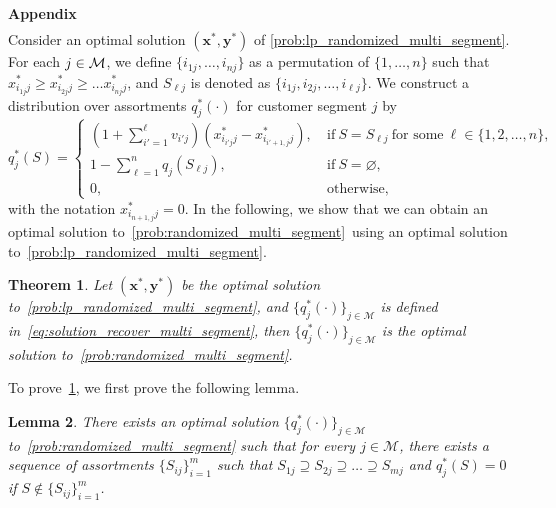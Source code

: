 \documentclass[msom,non-blindrev]{informs3} %
\newtheorem{theorem}{Theorem}
\newtheorem{lemma}[theorem]{Lemma}
\theoremstyle{definition}
\begin{document}
\begin{appendices}{\Large \noindent\textbf{Appendix}}
\begin{equation}
\begin{aligned}
\end{aligned}
\end{equation}
Consider an optimal solution $(\mathbf{x}^*,\mathbf{y}^*)$ of \eqref{prob:lp_randomized_multi_segment}. For each $j \in {\cal M}$, we define $\{i_{1j},\dots,i_{nj}\}$ as a permutation of $\{1,\dots,n\}$ such that $x^*_{i_{1j}j}\geq x^*_{i_{2j}j}\geq\dots x^*_{i_{nj}j}$, and $S_{\ell j}$ is denoted as $\{i_{1j},i_{2j},\dots,i_{\ell j}\}$. We construct a distribution over assortments $q_j^*(\cdot)$ for customer segment $j$ by
\begin{equation}
q^*_j(S)=\begin{cases}
\left(1+\sum_{i'=1}^\ell v_{i'j}\right)(x^*_{i_{i'j}j}-x^*_{i_{i'+1,j}j}),\ &\text{if}\ S=S_{\ell j}\ \text{for some}\ \ell\in\{1,2,\dots,n\},\\
1-\sum_{\ell=1}^n q_j(S_{\ell j}),\ &\text{if}\ S=\varnothing,\\
0,\ &\text{otherwise},
\end{cases}\label{eq:solution_recover_multi_segment}
\end{equation}
with the notation $x^*_{i_{n+1,j}j}=0$.
In the following, we show that we can obtain an optimal solution to~\eqref{prob:randomized_multi_segment}~using an optimal solution to~\eqref{prob:lp_randomized_multi_segment}.

\begin{theorem}\label{thm:randomized_multi_segment_lp}
Let $(\mathbf{x}^*,\mathbf{y}^*)$ be the optimal solution to~\eqref{prob:lp_randomized_multi_segment}, and $\{q_j^*(\cdot)\}_{j\in\mathcal{M}}$ is defined in~\eqref{eq:solution_recover_multi_segment}, then $\{q_j^*(\cdot)\}_{j\in\mathcal{M}}$ is the optimal solution to~\eqref{prob:randomized_multi_segment}.
\end{theorem}

To prove~\cref{thm:randomized_multi_segment_lp}, we first prove the following lemma.

\begin{lemma}\label{lemma:nested_support_multi_segment}
There exists an optimal solution $\{q_j^*(\cdot)\}_{j\in\mathcal{M}}$ to~\eqref{prob:randomized_multi_segment} 
such that for every $j\in\mathcal{M}$, there exists a sequence of assortments $\{S_{ij}\}_{i=1}^m$ such that $S_{1j}\supseteq S_{2j}\supseteq \dots \supseteq S_{mj}$ and $q_j^*(S)=0$ if $S\notin \{S_{ij}\}_{i=1}^m$. 
\end{lemma}


\end{appendices}
\end{document}
